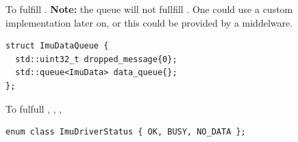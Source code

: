 To fulfill .
\textbf{Note:} the queue will not fullfill . One could use a custom implementation later on, or this could be provided by a middelware.
\begin{lstlisting}[style=cppstyle]
struct ImuDataQueue {
  std::uint32_t dropped_message{0};
  std::queue<ImuData> data_queue{};
};
\end{lstlisting}

To fulfull , , ,
\begin{lstlisting}[style=cppstyle]
enum class ImuDriverStatus { OK, BUSY, NO_DATA };
\end{lstlisting}
